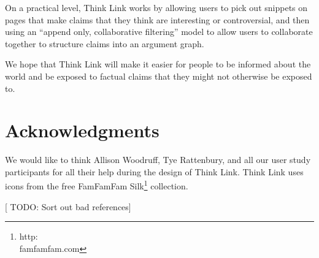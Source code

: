 \documentclass{chi2009}
\newcommand{\todo}[1]{{[\color{blue} TODO: #1]}}
\begin{document}
On a practical level, Think Link works by allowing users to pick out snippets on pages that make claims that they think are interesting or controversial, and then using an ``append only, collaborative filtering'' model to allow users to collaborate together to structure claims into an argument graph.

We hope that Think Link will make it easier for people to be informed about the world and be exposed to factual claims that they might not otherwise be exposed to.

\section{Acknowledgments}

We would like to think Allison Woodruff, Tye Rattenbury, and all our user study participants for all their help during the design of Think Link. Think Link uses icons from the free FamFamFam Silk\footnote{http:\\famfamfam.com} collection.


\todo{Sort out bad references}

\end{document}
